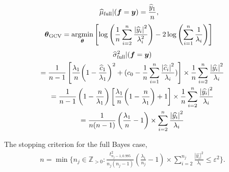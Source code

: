 \documentclass[smallextended]{svjour3}       %
\newcommand{\bm}[1]{\boldsymbol{#1}}
\newcommand{\posIntegers}{\mathbb{Z}_{> 0}}
\newcommand{\vtheta}{{\bm{\theta}}}
\newcommand{\vf}{\bm{f}}
\newcommand{\vy}{\bm{y}}
\def\abs#1{\ensuremath{\left \lvert #1 \right \rvert}}
\providecommand{\argmin}{\operatorname*{argmin}}
\begin{document}
\begin{align}
\label{FJH:eq:cubFull}
\widehat{\mu}_{\textup{full}}  \vert ( \vf = \vy) &= 
 \frac{\widehat{y}_1}{n} ,
\end{align}
\begin{align}
\vtheta_{\textup{GCV}} 
&= \argmin_\vtheta \left[ \log \left ( \frac 1n \sum_{i=2}^n \frac{\abs{\widehat{y}_i}^2}{\lambda_i^2} 
\right) -2\log\left( \sum_{i=1}^n \frac{1}{\lambda_i} \right)
\right]
\end{align}
\begin{multline*}
\widehat{\sigma}^2_{\textup{full}}  \vert ( \vf = \vy) \\ 
= 
\frac{1}{n-1} \left[\frac{\lambda_1}{n}{\left(1 - \frac{\widehat{c}_1}{\lambda_1}\right)^2} + (c_0  - \frac 1n \sum_{i=1}^n \frac{\abs{\widehat{c}_i}^2}{\lambda_i}) \right] 
\times
\frac{1}{n} \sum_{i=2}^n \frac{\abs{\widehat{y_i}}^2}{\lambda_i} 
\\
= 
\frac{1}{n-1} \left( 1- \frac{n}{\lambda_1}\right) \left[\frac{\lambda_1}{n}{\left(1 - \frac{n}{\lambda_1}\right)} + 1\right] 
\times
\frac{1}{n} \sum_{i=2}^n \frac{\abs{\widehat{y_i}}^2}{\lambda_i} 
\\
= 
\frac{1}{n(n-1)} \left( \frac{\lambda_1}{n} - 1\right)  
\times
 \sum_{i=2}^n \frac{\abs{\widehat{y_i}}^2}{\lambda_i} 
\end{multline*}

The stopping criterion for the full Bayes case,  
\begin{multline} \label{FJH:eq:stopcritHyper}
n  = \min \biggl \{n_j \in \posIntegers:  
\frac {t_{n_j-1,0.995}^2}{n_j(n_j - 1)} 
\left( \frac{\lambda_1}{n_j} - 1\right)  
\times
 \sum_{i=2}^{n_j} \frac{\abs{\widehat{y_i}}^2}{\lambda_i}  \le \varepsilon^2 \biggr\}.
\end{multline}
\end{document}
